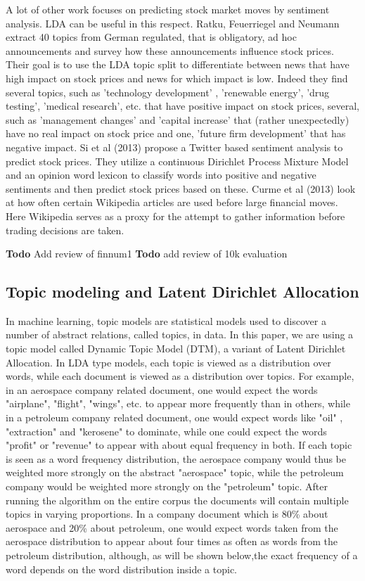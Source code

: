 \documentclass[12pt,journal,letterpaper,oneside,onecolumn]{IEEEtran}
\begin{document}
A lot of other work focuses on predicting stock market moves by sentiment
analysis. LDA can be useful in this respect.
Ratku, Feuerriegel and Neumann extract 40 topics from German regulated, that is obligatory, ad hoc
announcements and survey how these announcements influence stock prices. Their goal
is to use the LDA topic split to differentiate between news that have high impact on
stock prices and news for which impact is low. Indeed they find several topics, such
as 'technology development' , 'renewable energy', 'drug testing', 'medical research',
etc. that have positive impact on stock prices, several, such as 'management changes'
and 'capital increase' that (rather unexpectedly) have no real impact on stock price and
one, 'future firm development' that has negative impact.
Si et al (2013) propose a Twitter based sentiment analysis to predict stock
prices. They utilize a continuous Dirichlet Process Mixture Model and an opinion
word lexicon to classify words into positive and negative sentiments and then predict
stock prices based on these.
Curme et al (2013) look at how often certain Wikipedia articles are used before large
financial moves. Here Wikipedia serves as a proxy for the attempt to gather
information before trading decisions are taken.

\textbf{Todo} Add review of finnum1
\textbf{Todo} add review of 10k evaluation


\subsection{Topic modeling and Latent Dirichlet Allocation}
In machine learning, topic models are statistical models used to discover a number of abstract relations, called topics, in data. In this paper, we are using a topic model called Dynamic Topic Model (DTM), a variant of Latent Dirichlet Allocation.
In LDA type models, each topic is viewed as a distribution over words, while each document is viewed as a distribution over topics.
For example, in an aerospace company related document, one would expect the words "airplane", "flight", "wings", etc. to appear more frequently than in others, while in a petroleum company related document, one would expect words like "oil" , "extraction" and "kerosene" to dominate, while one could expect the words "profit" or "revenue" to appear with about equal frequency in both.
If each topic is seen as a word frequency distribution, the aerospace company would thus be weighted more strongly on the abstract "aerospace" topic, while the petroleum company would be weighted more strongly on the "petroleum" topic.
After running the algorithm on the entire corpus the documents will contain multiple topics in varying proportions. In a company document which is 80\% about aerospace and 20\% about petroleum, one would expect words taken from the aerospace distribution to appear about four times as often as words from the petroleum distribution, although, as will be shown below,the exact frequency of a word depends on the word distribution inside a topic.
\end{document}
